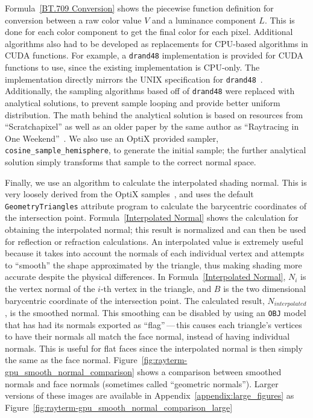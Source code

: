 Formula~\ref{BT.709 Conversion} shows the piecewise function definition for conversion between a raw color value $V$ and a luminance component $L$.
This is done for each color component to get the final color for each pixel.
Additional algorithms also had to be developed as replacements for CPU-based algorithms in CUDA functions.
For example, a \texttt{drand48} implementation is provided for CUDA functions to use, since the existing implementation is CPU-only.
The implementation directly mirrors the UNIX specification for \texttt{drand48}~\cite{drand48UNIX}.
Additionally, the sampling algorithms based off of \texttt{drand48} were replaced with analytical solutions, to prevent sample looping and provide better uniform distribution.
The math behind the analytical solution is based on resources from ``Scratchapixel'' as well as an older paper by the same author as ``Raytracing in One Weekend''~\cite{prunier2017global, shirley1997map}.
We also use an OptiX provided sampler, \texttt{cosine\_sample\_hemisphere}, to generate the initial sample; the further analytical solution simply transforms that sample to the correct normal space.


Finally, we use an algorithm to calculate the interpolated shading normal.
This is very loosely derived from the OptiX samples~\cite{optixsamples}, and uses the default \texttt{GeometryTriangles} attribute program to calculate the barycentric coordinates of the intersection point.
Formula~\ref{Interpolated Normal} shows the calculation for obtaining the interpolated normal; this result is normalized and can then be used for reflection or refraction calculations.
An interpolated value is extremely useful because it takes into account the normals of each individual vertex and attempts to ``smooth'' the shape approximated by the triangle, thus making shading more accurate despite the physical differences.
In Formula~\ref{Interpolated Normal}, $N_{i}$ is the vertex normal of the $i$-th vertex in the triangle, and $B$ is the two dimensional barycentric coordinate of the intersection point.
The calculated result, $N_{interpolated}$, is the smoothed normal.
This smoothing can be disabled by using an \texttt{OBJ} model that has had its normals exported as ``flag''\,---\,this causes each triangle's vertices to have their normals all match the face normal, instead of having individual normals.
This is useful for flat faces since the interpolated normal is then simply the same as the face normal.
Figure~\ref{fig:rayterm-gpu_smooth_normal_comparison} shows a comparison between smoothed normals and face normals (sometimes called ``geometric normals'').
Larger versions of these images are available in Appendix~\ref{appendix:large_figures} as Figure~\ref{fig:rayterm-gpu_smooth_normal_comparison_large}

